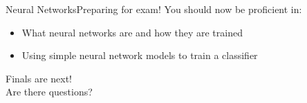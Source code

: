 \begin{frame}{Neural Networks}{Preparing for exam!}
    You should now be proficient in:
    \begin{itemize}
        \item What neural networks are and how they are trained
        \item Using simple neural network models to train a classifier
    \end{itemize}
    \vfill \pause
    \begin{center}
        \huge
        Finals are next!
        \\[1em]
        Are there questions?
    \end{center}
    \vfill
\end{frame}
